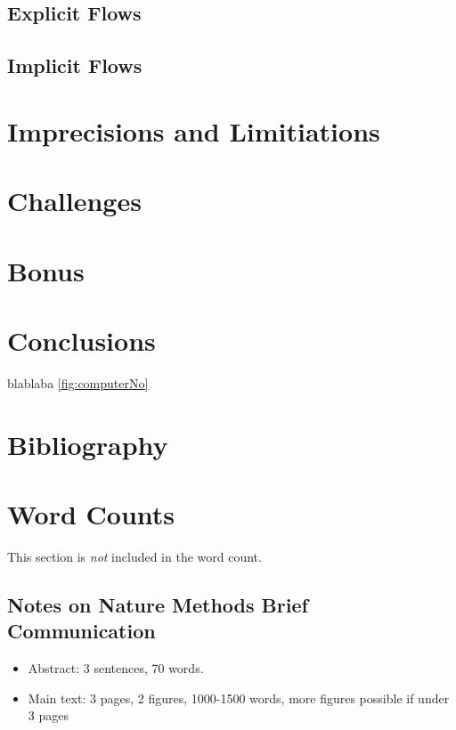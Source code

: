 \documentclass[times, twoside, watermark]{zHenriquesLab-StyleBioRxiv}
\begin{document}
\subsection*{Explicit Flows}

\subsection*{Implicit Flows}


\section*{Imprecisions and Limitiations}

\section*{Challenges}

\section*{Bonus}

\section*{Conclusions}

blablaba \ref{fig:computerNo} 
\blindtext

\section*{Bibliography}


\onecolumn
\newpage

\section*{Word Counts}
This section is \textit{not} included in the word count. 
\subsection*{Notes on Nature Methods Brief Communication}
\begin{itemize}
\item Abstract: 3 sentences, 70 words.
\item Main text: 3 pages, 2 figures, 1000-1500 words, more figures possible if under 3 pages
\end{itemize}
\end{document}
